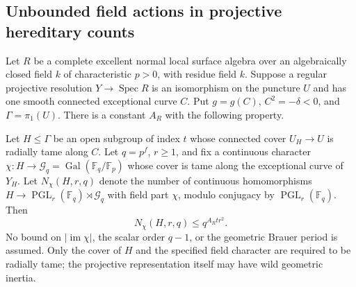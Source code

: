 \subsection{Unbounded field actions in projective hereditary counts}

\begin{theorem}
\label{D:tame-projective-semilinear-count}
Let $R$ be a complete excellent normal local surface algebra over
an algebraically closed field $k$ of characteristic $p>0$, with
residue field $k$. Suppose a regular projective resolution
$Y\to\operatorname{Spec}R$ is an isomorphism on the puncture
$U$ and has one smooth connected exceptional curve $C$.
Put $g=g(C)$, $C^2=-\delta<0$, and $\Gamma=\pi_1(U)$.
There is a constant $A_R$ with the following property.

Let $H\leq\Gamma$ be an open subgroup of index $t$ whose
connected cover $U_H\to U$ is radially tame along $C$.
Let $q=p^f$, $r\geq1$, and fix a continuous character
$\chi:H\to\mathcal G_q=\operatorname{Gal}(\mathbb F_q/\mathbb F_p)$
whose cover is tame along the exceptional curve of $Y_H$.
Let $N_\chi(H,r,q)$ denote the number of continuous homomorphisms
$H\to\operatorname{PGL}_r(\mathbb F_q)\rtimes\mathcal G_q$
with field part $\chi$, modulo conjugacy by
$\operatorname{PGL}_r(\mathbb F_q)$. Then
\[
                   N_\chi(H,r,q)\leq q^{A_Rtr^2}.       \tag{D.PS.1}
\]
No bound on $|\operatorname{im}\chi|$, the
scalar order $q-1$, or the geometric Brauer period is assumed.
Only the cover of $H$ and the specified field character are
required to be radially tame; the projective representation
itself may have wild geometric inertia.
\end{theorem}

